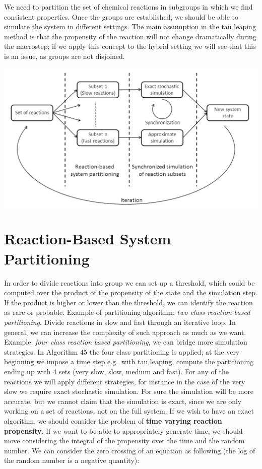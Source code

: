We need to partition the set of chemical reactions in subgroups in which we find consistent properties.
Once the groups are established, we should be able to simulate the system in different settings.
The main assumption in the tau leaping method is that the propensity of the reaction will not change dramatically during the macrostep; if we apply this concept to the hybrid setting we will see that this is an issue, as groups are not disjoined.

\includegraphics[width=\textwidth]{scheme.png}

\section{Reaction-Based System Partitioning}
In order to divide reactions into group we can set up a threshold, which could be computed over the product of the propensity of the state and the simulation step.
If the product is higher or lower than the threshold, we can identify the reaction as rare or probable.
Example of partitioning algorithm: \emph{two class reaction-based partitioning}.
Divide reactions in slow and fast through an iterative loop.
In general, we can increase the complexity of such approach as much as we want.
Example: \emph{four class reaction based partitioning}, we can bridge more simulation strategies.
In Algorithm 45 the four class partitioning is applied; at the very beginning we impose a time step e.g.~with tau leaping, compute the partitioning ending up with 4 sets (very slow, slow, medium and fast).
For any of the reactions we will apply different strategies, for instance in the case of the very slow we require exact stochastic simulation.
For sure the simulation will be more accurate, but we cannot claim that the simulation is exact, since we are only working on a set of reactions, not on the full system.
If we wish to have an exact algorithm, we should consider the problem of \textbf{time varying reaction propensity}.
If we want to be able to appropriately generate time, we should move considering the integral of the propensity over the time and the random number.
We can consider the zero crossing of an equation as following (the log of the random number is a negative quantity):

